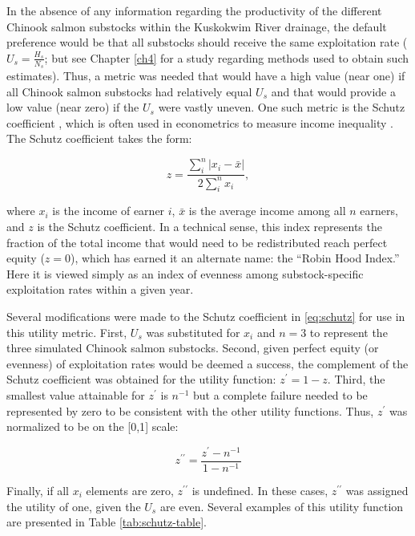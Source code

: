 \documentclass[12pt,]{book}
\theoremstyle{definition}
\theoremstyle{definition}
\theoremstyle{definition}
\theoremstyle{remark}
\begin{document}
\noindent
In the absence of any information regarding the productivity of the
different Chinook salmon substocks within the Kuskokwim River drainage,
the default preference would be that all substocks should receive the
same exploitation rate (\(U_s = \frac{H_s}{N_s}\); but see Chapter
\ref{ch4} for a study regarding methods used to obtain such estimates).
Thus, a metric was needed that would have a high value (near one) if all
Chinook salmon substocks had relatively equal \(U_s\) and that would
provide a low value (near zero) if the \(U_s\) were vastly uneven. One
such metric is the Schutz coefficient \citep{habib-2012, schutz-1951},
which is often used in econometrics to measure income inequality
\citep[\emph{e}.\emph{g}.,][]{kennedy-etal-1996}. The Schutz coefficient
takes the form:

\begin{equation}
  z = \frac{\sum_i^n|x_i-\bar{x}|}{2\sum_i^nx_i},
  \label{eq:schutz}
\end{equation}

\noindent
where \(x_i\) is the income of earner \(i\), \(\bar{x}\) is the average
income among all \(n\) earners, and \(z\) is the Schutz coefficient. In
a technical sense, this index represents the fraction of the total
income that would need to be redistributed reach perfect equity
(\(z = 0\)), which has earned it an alternate name: the ``Robin Hood
Index.'' Here it is viewed simply as an index of evenness among
substock-specific exploitation rates within a given year.

Several modifications were made to the Schutz coefficient in
\eqref{eq:schutz} for use in this utility metric. First, \(U_s\) was
substituted for \(x_i\) and \(n=3\) to represent the three simulated
Chinook salmon substocks. Second, given perfect equity (or evenness) of
exploitation rates would be deemed a success, the complement of the
Schutz coefficient was obtained for the utility function:
\(z^\prime = 1 - z\). Third, the smallest value attainable for
\(z^\prime\) is \(n^{-1}\) but a complete failure needed to be
represented by zero to be consistent with the other utility functions.
Thus, \(z^\prime\) was normalized to be on the {[}0,1{]} scale:

\begin{equation}
  z^{\prime\prime} = \frac{z^\prime-n^{-1}}{1 - n^{-1}}
  \label{eq:mod-schutz}
\end{equation}

\noindent
Finally, if all \(x_i\) elements are zero, \(z^{\prime\prime}\) is
undefined. In these cases, \(z^{\prime\prime}\) was assigned the utility
of one, given the \(U_s\) are even. Several examples of this utility
function are presented in Table \ref{tab:schutz-table}.
\end{document}
